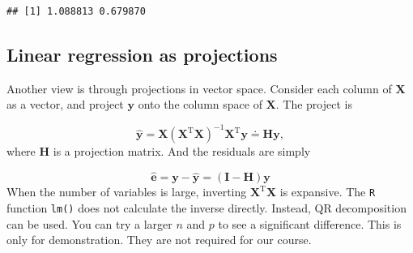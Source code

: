 \documentclass[
]{book}
\newenvironment{Shaded}{\begin{snugshade}}{\end{snugshade}}
\newcommand{\CommentTok}[1]{\textcolor[rgb]{0.56,0.35,0.01}{\textit{#1}}}
\newcommand{\DecValTok}[1]{\textcolor[rgb]{0.00,0.00,0.81}{#1}}
\newcommand{\FloatTok}[1]{\textcolor[rgb]{0.00,0.00,0.81}{#1}}
\newcommand{\KeywordTok}[1]{\textcolor[rgb]{0.13,0.29,0.53}{\textbf{#1}}}
\newcommand{\NormalTok}[1]{#1}
\newcommand{\OperatorTok}[1]{\textcolor[rgb]{0.81,0.36,0.00}{\textbf{#1}}}
\newcommand{\StringTok}[1]{\textcolor[rgb]{0.31,0.60,0.02}{#1}}
\begin{document}
\begin{verbatim}
## [1] 1.088813 0.679870
\end{verbatim}

\hypertarget{linear-reg}{%
\subsection{Linear regression as projections}\label{linear-reg}}

Another view is through projections in vector space. Consider each column of \(\mathbf{X}\) as a vector, and project \(\mathbf{y}\) onto the column space of \(\mathbf{X}\). The project is

\[ \widehat{\mathbf{y}} = \mathbf{X} (\mathbf{X}^\text{T} \mathbf{X})^{-1}\mathbf{X}^\text{T} \mathbf{y} \doteq {\mathbf{H}} \mathbf{y}, \]
where \(\mathbf{H}\) is a projection matrix. And the residuals are simply

\[ \widehat{\mathbf{e}} = \mathbf{y} - \widehat{\mathbf{y}} = (\mathbf{I} - \mathbf{H}) \mathbf{y} \]
When the number of variables is large, inverting \(\mathbf{X}^\text{T} \mathbf{X}\) is expansive. The \texttt{R} function \texttt{lm()} does not calculate the inverse directly. Instead, QR decomposition can be used. You can try a larger \(n\) and \(p\) to see a significant difference. This is only for demonstration. They are not required for our course.

\begin{Shaded}
\end{Shaded}
\end{document}

